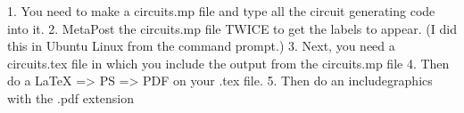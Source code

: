 1.  You need to make a circuits.mp file and type all the circuit generating code into it.
2.  MetaPost the circuits.mp file TWICE to get the labels to appear.  (I did this in Ubuntu Linux from the command prompt.)
3.  Next, you need a circuits.tex file in which you include the output from the circuits.mp file
4.  Then do a LaTeX => PS => PDF on your .tex file.
5.  Then do an includegraphics with the .pdf extension
 